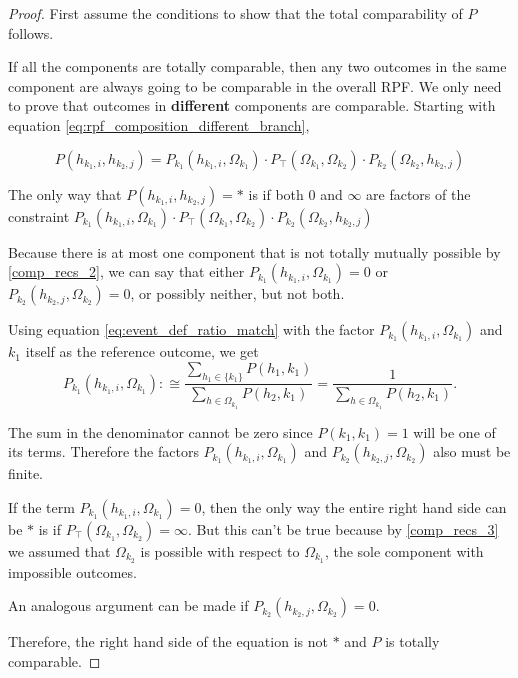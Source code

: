 \documentclass[twoside]{article}
\theoremstyle{plain}%
\theoremstyle{definition}
\theoremstyle{remark}
\begin{document}
\begin{proof}
First assume the conditions to show that the total comparability of \(P\) follows.

If all the components are totally comparable, then any two outcomes in the same component are always going to be comparable in the overall RPF. We only need to prove that outcomes in \textbf{different} components are comparable. Starting with equation \ref{eq:rpf_composition_different_branch},

\begin{equation}
P(h_{k_1, i}, h_{k_2, j}) = P_{k_1}(h_{k_1, i}, \Omega_{k_1}) \cdot  P_{\top}(\Omega_{k_1}, \Omega_{k_2}) \cdot P_{k_2}(\Omega_{k_2}, h_{k_2, j})
\end{equation}

The only way that \(P(h_{k_1, i}, h_{k_2, j}) = \ast\) is if both \(0\) and \(\infty\) are factors of the constraint \(P_{k_1}(h_{k_1, i}, \Omega_{k_1}) \cdot  P_{\top}(\Omega_{k_1}, \Omega_{k_2}) \cdot P_{k_2}(\Omega_{k_2}, h_{k_2, j})\)

Because there is at most one component that is not totally mutually possible by \ref{comp_recs_2}, we can say that either \(P_{k_1}(h_{k_1, i}, \Omega_{k_1}) = 0\) or \(P_{k_2}(h_{k_2, j}, \Omega_{k_2}) = 0\), or possibly neither, but not both.

Using equation \ref{eq:event_def_ratio_match} with the factor \(P_{k_1}(h_{k_1, i}, \Omega_{k_1})\) and \(k_1\) itself as the reference outcome, we get
\[
P_{k_1}(h_{k_1, i}, \Omega_{k_1}) :\cong \frac{\sum_{h_1 \in \{k_1\}} P(h_1, k_1)}{\sum_{h \in \Omega_{k_1}} P(h_2, k_1)} = \frac{1}{\sum_{h \in \Omega_{k_1}} P(h_2, k_1)}.
\]

The sum in the denominator cannot be zero since \(P(k_1, k_1) = 1\) will be one of its terms. Therefore the factors \(P_{k_1}(h_{k_1, i}, \Omega_{k_1})\) and \(P_{k_2}(h_{k_2, j}, \Omega_{k_2})\) also must be finite.

If the term \(P_{k_1}(h_{k_1, i}, \Omega_{k_1}) = 0\), then the only way the entire right hand side can be \(\ast\) is if \(P_{\top}(\Omega_{k_1}, \Omega_{k_2}) = \infty\). But this can't be true because by \ref{comp_recs_3} we assumed that \(\Omega_{k_2}\) is possible with respect to \(\Omega_{k_1}\), the sole component with impossible outcomes.

An analogous argument can be made if \(P_{k_2}(h_{k_2, j}, \Omega_{k_2}) = 0\).

Therefore, the right hand side of the equation is not \(\ast\) and \(P\) is totally comparable.


\end{proof}
\end{document}

